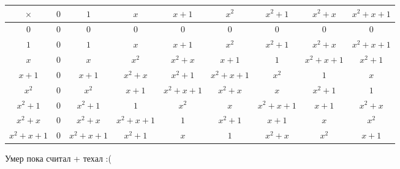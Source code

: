 \documentclass[a4paper,12pt]{article}
\begin{document}
\begin{center}
{\footnotesize \begin{tabular}{|c|c|c|c|c|c|c|c|c|}
\hline
 $\times$ & $0$ & $1$ & $x$ & $x + 1 $ &  $x^2$& $ x^2 + 1$ & $x^2 + x$  &$  x^2 + x + 1 $\\
\hline
 $0$&  $0$&$0$  &$0$  &$0$  &$0$  &$0$ &$0$   & $0$ \\
\hline
$1$ & $0$ &  $1$& $x $  &$x + 1$  &$x^2$  & $x^2 + 1$ &  $x^2 + x $& $x^2 + x + 1$ \\
\hline
 $x$& $0$ &  $x$&  $x^2$&$x^2  + x$  & $x+ 1$ &  $1$&  $x^2 + x + 1$& $x^2+ 1$ \\
\hline
$x + 1$ & $0$ & $x  + 1$& $x^2 + x$ &$x^2 + 1$  &$x^2 + x + 1$  &$x^2$  & $1$ &$x$  \\
\hline
$x^2$ &$0$  &$x^2$  &$x + 1$  & $x^2 + x + 1$ & $x^2 + x$ & $x$ &$x^2 + 1$  &$1$  \\
\hline
 $x^2 + 1$&$0$  & $x^2 + 1$ & $1$ & $x^2$ &  $x$&$x^2 + x + 1$  &  $x + 1$&  $x^2 + x$\\
\hline
 $x^2 + x$&$0$  &$x^2 + x$  & $x^2 + x + 1$ & $1$ &  $x^2 +1$& $x+1$ &$x$  & $x^2$ \\
\hline
 $x^2 + x + 1$& $0$ & $x^2+x + 1$ &$x^2+1$  &$x$  &$1$  & $x^2 + x$ & $x^2$ & $x+1$ \\
\hline
\end{tabular}
}
\end{center}
\begin{center}
Умер пока считал + техал :(
\end{center}
\end{document}
